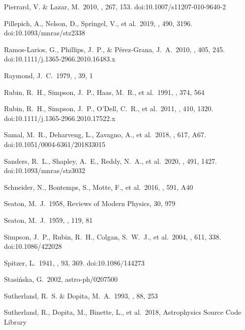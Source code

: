\documentclass[twocolumn]{aastex62}
\begin{document}
\begin{CJK*}{UTF8}{gbsn}
\begin{thebibliography}{}
 Pierrard, V. \& Lazar, M.\ 2010, \solphys, 267, 153. doi:10.1007/s11207-010-9640-2

 Pillepich, A., Nelson, D., Springel, V., et al.\ 2019, \mnras, 490, 3196. doi:10.1093/mnras/stz2338

 Ramos-Larios, G., Phillips, J.~P., \& P{\'e}rez-Grana, J.~A.\ 2010, \mnras, 405, 245. doi:10.1111/j.1365-2966.2010.16483.x

 Raymond, J.~C.\ 1979, \apjs, 39, 1

 Rubin, R.~H., Simpson, J.~P., Haas, M.~R., et al.\ 1991, \apj, 374, 564

 Rubin, R.~H., Simpson, J.~P., O'Dell, C.~R., et al.\ 2011, \mnras, 410, 1320. doi:10.1111/j.1365-2966.2010.17522.x

 Samal, M.~R., Deharveng, L., Zavagno, A., et al.\ 2018, \aap, 617, A67. doi:10.1051/0004-6361/201833015

 Sanders, R.~L., Shapley, A.~E., Reddy, N.~A., et al.\ 2020, \mnras, 491, 1427. doi:10.1093/mnras/stz3032

 Schneider, N., Bontemps, S., Motte, F., et al.\ 2016, \aap, 591, A40

 Seaton, M.~J.\ 1958, Reviews of Modern Physics, 30, 979

 Seaton, M.~J.\ 1959, \mnras, 119, 81

 Simpson, J.~P., Rubin, R.~H., Colgan, S.~W.~J., et al.\ 2004, \apj, 611, 338. doi:10.1086/422028

 Spitzer, L.\ 1941, \apj, 93, 369. doi:10.1086/144273

 Stasi{\'n}ska, G.\ 2002, astro-ph/0207500

 Sutherland, R.~S. \& Dopita, M.~A.\ 1993, \apjs, 88, 253

 Sutherland, R., Dopita, M., Binette, L., et al.\ 2018, Astrophysics Source Code Library


\end{thebibliography}
\end{CJK*}
\end{document}
